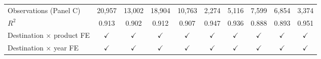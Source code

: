\begin{tabular}{l*{9}{c}}
Observations (Panel C) & 20,957 & 13,002 & 18,904 & 10,763 & 2,274 & 5,116 & 7,599 & 6,854 & 3,374 \\
$R^2$ & 0.913 & 0.902 & 0.912 & 0.907 & 0.947 & 0.936 & 0.888 & 0.893 & 0.951 \\
\midrule
Destination $\times$ product FE & $\checkmark$ & $\checkmark$ & $\checkmark$ & $\checkmark$ & $\checkmark$ & $\checkmark$ & $\checkmark$ & $\checkmark$ & $\checkmark$ \\
Destination $\times$ year FE & $\checkmark$ & $\checkmark$ & $\checkmark$ & $\checkmark$ & $\checkmark$ & $\checkmark$ & $\checkmark$ & $\checkmark$ & $\checkmark$ \\
\bottomrule
\end{tabular}
